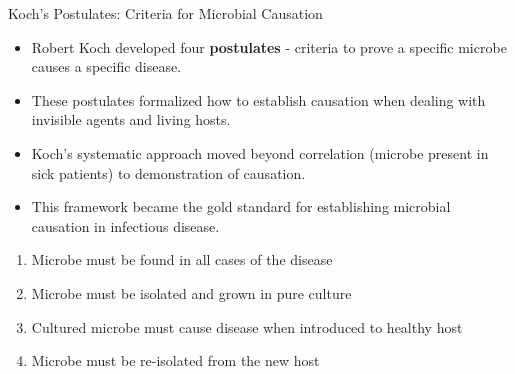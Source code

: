 \documentclass{beamer}
\begin{document}
	\begin{frame}{Koch's Postulates: Criteria for Microbial Causation}
		\begin{itemize}
			\item Robert Koch developed four \textbf{postulates} - criteria to prove a specific microbe causes a specific disease.
			\item These postulates formalized how to establish causation when dealing with invisible agents and living hosts.
			\item Koch's systematic approach moved beyond correlation (microbe present in sick patients) to demonstration of causation.
			\item This framework became the gold standard for establishing microbial causation in infectious disease.
		\end{itemize}
		
		\begin{example}
			\begin{enumerate}
				\item Microbe must be found in all cases of the disease
				\item Microbe must be isolated and grown in pure culture
				\item Cultured microbe must cause disease when introduced to healthy host
				\item Microbe must be re-isolated from the new host
			\end{enumerate}
		\end{example}
	\end{frame}
	
\end{document}
